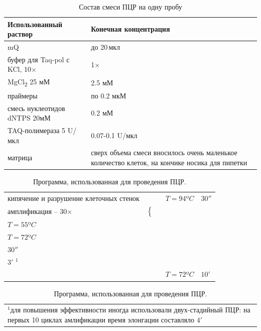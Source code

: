 \begin{table}[H]
	\small
	\caption{Состав смеси ПЦР на одну пробу}
	\label{table:pcrmix}
	\begin{tabular}{p{0.4\width - \tabcolsep} p{0.6\width - \tabcolsep}}
		\graytable
		\toprule
		Использованный раствор &  Конечная концентрация \\
		\midrule
		mQ & до 20\,мкл\\ \verythinrule
		буфер для Taq-pol с KCl, 10$\times$ & 1$\times$\\ \verythinrule
		MgCl\textsubscript{2}  25 мМ & 2.5 мМ\\ \verythinrule
		праймеры & по 0.2 мкМ\\ \verythinrule
		смесь нуклеотидов dNTPS 20мМ & 0.2 мМ \\ \verythinrule
		TAQ-полимераза 5 U/мкл & 0.07-0.1 U/мкл\\ \verythinrule
		матрица & сверх объема смеси вносилось очень маленькое количество клеток, на кончике носика для пипетки\\ 
		\bottomrule
	\end{tabular}
\end{table}



\begin{table}[H]
	\small
	\caption{Программа, использованная для проведения ПЦР.}
	\label{table:pcrprog}
	\begin{tabular}{ >{\raggedleft\arraybackslash}p{0.3\width} p{0.01\width} l l}
		кипячение и разрушение клеточных стенок & &$T = 94ºC$ & $ 30''$ \\ \thinrule
		амплификация  -- 30$\times$ & $\begin{cases} \\  \\	\end{cases}  $ 
			&  \pbox{20cm}{$T = 94ºC $\\ $T = 55ºC $\\$T = 72ºC $ } 
			&\pbox{2cm}{$30''$\\ $30''$\\$3'$ $^1$} 
			\\ \thinrule
		&&$T = 72ºC$&$ 10'$  \\	
		\end{tabular}
		
		
		\begin{tabular}{p{1\width}}
			$^1$для повышения эффективности иногда использовали двух-стадийный ПЦР: на первых 10 циклах амлификации время элонгации составляло $4'$
			\\
	\end{tabular}

\end{table}



